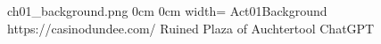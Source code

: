 	{ch01_background.png}				%
	{0cm}								%
	{0cm}								%
	{width=\paperwidth}					%
	{Act01Background}					%
	{https://casinodundee.com/}			%
	{Ruined Plaza of Auchtertool}		%
	{ChatGPT}							%
	



